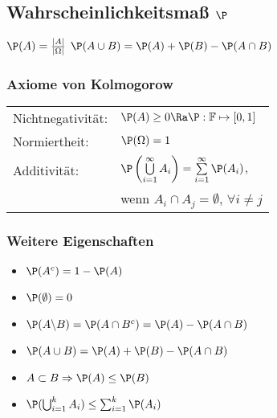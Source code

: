 \documentclass[german,color,6pt]{latex4ei/latex4ei_sheet}
\begin{document}
\begin{sectionbox}
	\subsection{Wahrscheinlichkeitsmaß $\P$}
	$\P(A) = \frac{|A|}{|\Omega|}$ \hfill $\P(A \cup B) = \P(A) + \P(B) - \P(A \cap B)$\\
	\subsubsection{Axiome von Kolmogorow}
	\begin{tabular}{ll}
		Nichtnegativität: & $\P(A) \geq 0 \Ra \P:\mathbb F \mapsto [0,1]$ \\
		Normiertheit: & $\P(\Omega) = 1$ \\
		Additivität: & $\P\left(\bigcup\limits_{i=1}^{\infty} A_i \right) = \sum\limits_{i=1}^{\infty} \P(A_i)$, \\
		& wenn $A_i \cap A_j = \emptyset$, $\forall i \neq j$ \\
	\end{tabular}
	\subsubsection{Weitere Eigenschaften}
	\begin{itemize}	
		\item 	$\P(A^c) = 1 - \P(A)$
		\item 	$\P(\emptyset) = 0$
		\item 	$\P(A \backslash B) = \P(A \cap B^c) = \P(A) - \P(A \cap B)$
		\item 	$\P(A \cup B) = \P(A) + \P (B) - \P(A \cap B)$
		\item 	$A \subset B \Rightarrow \P(A) \leq \P(B)$
		\item 	$\P(\bigcup_{i=1}^k A_i) \leq \sum_{i=1}^k \P(A_i)$
	\end{itemize}
	

\end{sectionbox}
\vfill

\end{document}
